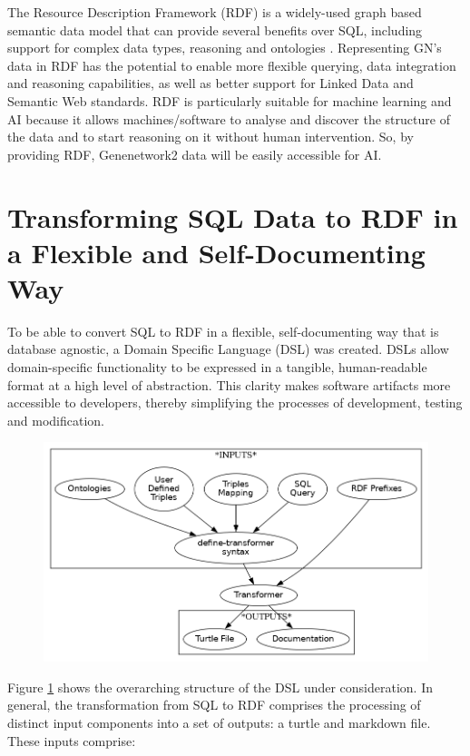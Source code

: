 \documentclass{article}
\begin{document}
The Resource Description Framework (RDF) is a widely-used graph based semantic data model that can provide several benefits over SQL, including support for complex data types, reasoning and ontologies \cite{allemang2011semantic}\cite{candan2001resource}.  Representing GN's data in RDF has the potential to enable more flexible querying, data integration and reasoning capabilities, as well as better support for Linked Data and Semantic Web standards.  RDF is particularly suitable for machine learning and AI because it allows machines/software to analyse and discover the structure of the data and to start reasoning on it without human intervention.  So, by providing RDF, Genenetwork2 data will be easily accessible for AI.

\section{Transforming SQL Data to RDF in a Flexible and Self-Documenting Way}

To be able to convert SQL to RDF in a flexible, self-documenting way that is database agnostic, a Domain Specific Language (DSL) was created.  DSLs allow domain-specific functionality to be expressed in a tangible, human-readable format at a high level of abstraction.  This clarity makes software artifacts more accessible to developers, thereby simplifying the processes of development, testing and modification.

\begin{figure}[h]
  \centering
  \includegraphics[width=0.7\linewidth]{systemDesign}
  \caption{\textit{}}
  \label{fig:system-diagram}
  \centering
\end{figure}

Figure \ref{fig:system-diagram} shows the overarching structure of the DSL under consideration.  In general, the transformation from SQL to RDF comprises the processing of distinct input components into a set of outputs: a turtle and markdown file.  These inputs comprise:
\end{document}
